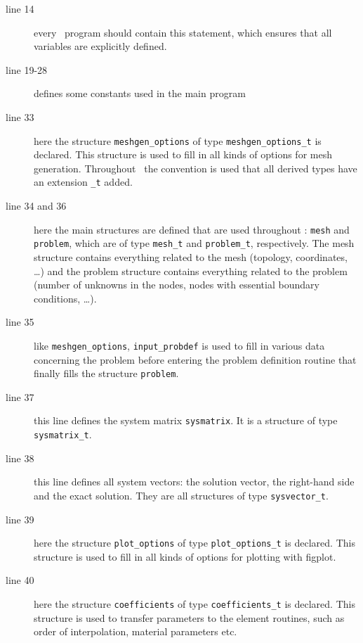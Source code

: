 \begin{description}
   \item[line 14] every \ftn\ program should contain this statement, which
       ensures that all variables are explicitly defined.
   \item[line 19-28] defines some constants used in the main program
   \item[line 33] here the structure \texttt{meshgen\_options}
     of type
      \texttt{meshgen\_options\_t} is declared.
 This structure is used to fill in all kinds
 of options for mesh generation. Throughout \tfem\ the convention is used
 that all derived types have an extension \texttt{\_t} added. 
   \item[line 34 and 36] here the main structures are defined that are used
throughout \tfem: \texttt{mesh} and \texttt{problem}, which are of type
\texttt{mesh\_t} and \texttt{problem\_t}, respectively. The mesh structure
contains everything related to the mesh (topology, coordinates, \ldots) and the
problem structure contains everything related to the problem (number of
unknowns in the nodes, nodes with essential boundary conditions, \ldots).

\item[line 35] like \texttt{meshgen\_options}, \texttt{input\_probdef} is used
to fill in various data concerning the problem before entering the problem
definition routine that finally fills the structure \texttt{problem}.

\item[line 37] this line defines the system matrix \texttt{sysmatrix}. It is a
structure of type \texttt{sysmatrix\_t}.

\item[line 38] this line defines all system vectors: the solution vector, the
right-hand side and the exact solution.  They are all
structures of type \texttt{sysvector\_t}.

\item[line 39] here the structure \texttt{plot\_options} of type
\texttt{plot\_options\_t} is declared.
 This structure is used to fill in all kinds
 of options for plotting with figplot. 

\item[line 40] here the structure \texttt{coefficients} of type
\texttt{coefficients\_t} is declared.
 This structure is used to transfer parameters to the element routines, such
 as order of interpolation, material parameters etc.

\end{description}


